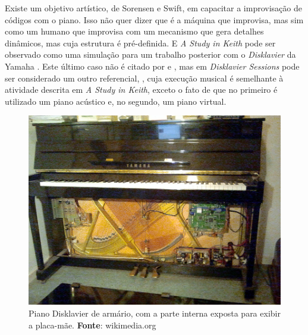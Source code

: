 Existe um objetivo artístico, de Sorensen e Swift, em capacitar a improvisação de códigos com o piano. Isso não quer dizer que é a máquina que improvisa, mas sim como um humano que improvisa com um mecanismo que gera detalhes dinâmicos, mas cuja estrutura é pré-definida. E \emph{A Study in Keith} pode ser observado como uma simulação para um trabalho posterior com o \emph{Disklavier} da Yamaha . Este último caso não é citado por  e , mas em \emph{Disklavier Sessions} \cite{sorensen_disklavier_2013} pode ser considerado um outro referencial, , cuja execução musical é semelhante à atividade descrita em \emph{A Study in Keith}, exceto o fato de que no primeiro é utilizado um piano acústico e, no segundo, um piano virtual.

\begin{figure}[h]
  \centering
  \includegraphics[scale=0.5]{imagens/disklavier.jpg}
  \caption{Piano Disklavier de armário, com a parte interna exposta para exibir a placa-mãe. \textbf{Fonte}: wikimedia.org}
  \label{fig:disklavier}
\end{figure}

\begin{citacao}
\end{citacao}

